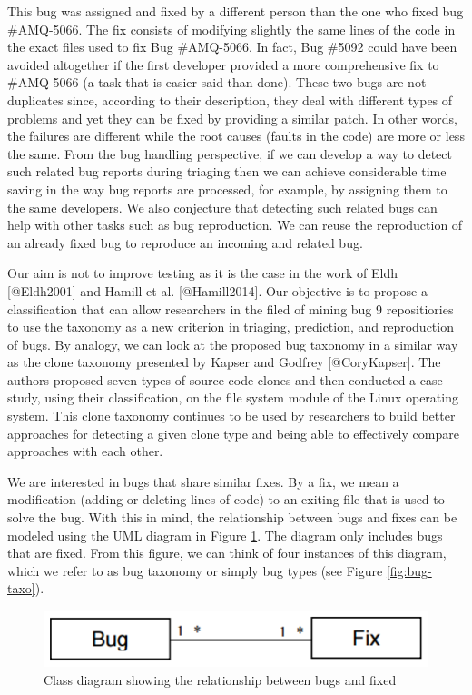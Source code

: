 This bug was assigned and fixed by a different person than the one who
fixed bug \#AMQ-5066. The fix consists of modifying slightly the same
lines of the code in the exact files used to fix Bug \#AMQ-5066. In
fact, Bug \#5092 could have been avoided altogether if the first
developer provided a more comprehensive fix to \#AMQ-5066 (a task that
is easier said than done). These two bugs are not duplicates since,
according to their description, they deal with different types of
problems and yet they can be fixed by providing a similar patch. In
other words, the failures are different while the root causes (faults in
the code) are more or less the same. From the bug handling perspective,
if we can develop a way to detect such related bug reports during
triaging then we can achieve considerable time saving in the way bug
reports are processed, for example, by assigning them to the same
developers. We also conjecture that detecting such related bugs can help
with other tasks such as bug reproduction. We can reuse the reproduction
of an already fixed bug to reproduce an incoming and related bug.

Our aim is not to improve testing as it is the case in the work of Eldh
{[}@Eldh2001{]} and Hamill et al. {[}@Hamill2014{]}. Our objective is to
propose a classification that can allow researchers in the filed of
mining bug 9 repositiories to use the taxonomy as a new criterion in
triaging, prediction, and reproduction of bugs. By analogy, we can look
at the proposed bug taxonomy in a similar way as the clone taxonomy
presented by Kapser and Godfrey {[}@CoryKapser{]}. The authors proposed
seven types of source code clones and then conducted a case study, using
their classification, on the file system module of the Linux operating
system. This clone taxonomy continues to be used by researchers to build
better approaches for detecting a given clone type and being able to
effectively compare approaches with each other.

We are interested in bugs that share similar fixes. By a fix, we mean a
modification (adding or deleting lines of code) to an exiting file that
is used to solve the bug. With this in mind, the relationship between
bugs and fixes can be modeled using the UML diagram in Figure
\ref{fig:bug-taxo-diag}. The diagram only includes bugs that are fixed.
From this figure, we can think of four instances of this diagram, which
we refer to as bug taxonomy or simply bug types (see Figure
\ref{fig:bug-taxo}).

\begin{figure}[h!]
  \centering
    \includegraphics[scale=0.5]{media/bug-taxo-class-diag.png}
    \caption{Class diagram showing the relationship between bugs and fixed
    \label{fig:bug-taxo-diag}}
\end{figure}


